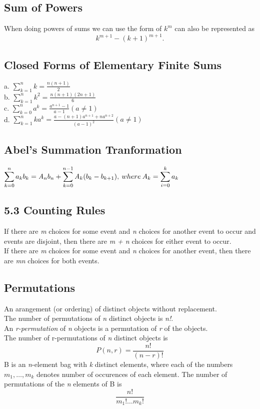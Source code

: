 \documentclass[10pt,twocolumn]{article}
\begin{document}
	\subsection*{Sum of Powers}
	When doing powers of sums we can use the form of $k^m$ can also be
	represented as \[k^{m+1} - ( k + 1)^{m+1}.\]

	\subsection*{Closed Forms of Elementary Finite Sums}
	a. $\displaystyle\sum_{k=1}^n k = \frac{n(n+1)}{2}$\\
	b. $\displaystyle\sum_{k=1}^n k^2 = \frac{n(n+1)(2n+1)}{6}$\\
	c. $\displaystyle\sum_{k=0}^n a^k = \frac{a^{n+1} - 1}{a -1} ( a \neq
	1)$\\
	d. $\displaystyle\sum_{k=1}^n ka^k = \frac{a - (n + 1)a^{n+1} +
	  na^{n+2}}{(a-1)^2} (a \neq 1)$\\

	\subsection*{Abel's Summation Tranformation}
	$\displaystyle\sum_{k=0}^n a_kb_k = \mathit{A}_nb_n + \sum_{k=0}^{n-1}
	\mathit{A}_k(b_k - b_{k+1}),\\
	  \:where\:A_k = \sum_{i=0}^k a_k$
	
	\subsection*{5.3 Counting Rules}
	If there are \textit{m} choices for some event and \textit{n} choices for another event to occur and events are disjoint, then there are \textit{m + n} choices for either event to occur. \\
	If there are \textit{m} choices for some event and \textit{n} choices for another event, then there are \textit{mn} choices for both events.
	\subsection*{Permutations}
	An arangement (or ordering) of distinct objects without replacement. \\
	The number of permutations of \textit{n} distinct objects is \textit{n!}. \\
	An \textit{r-permutation} of \textit{n} objects is a permutation of \textit{r} of the objects. \\
	The number of r-permutations of \textit{n} distinct objects is
	\[P(n, r)=\frac{n!}{(n - r)!}\]
	B is an \textit{n}-element bag with \textit{k} distinct elements, where each of the numbers $m_1,\ldots,m_k$ denotes number of occurences of each element.  The number of permutations of the \textit{n} elements of B is \[\frac{n!}{m_1! \ldots m_k!}\]
\end{document}
